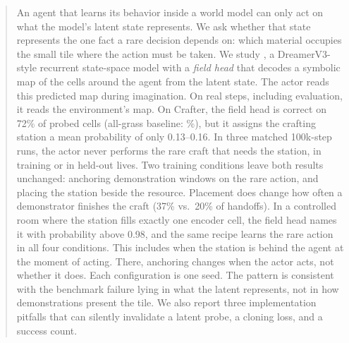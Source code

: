 \begin{abstract}
An agent that learns its behavior inside a world model can only act on what the model's latent state represents. We ask whether that state represents the one fact a rare decision depends on: which material occupies the small tile where the action must be taken.
We study \method{}, a DreamerV3-style recurrent state-space model with a \emph{field head} that decodes a symbolic map of the cells around the agent from the latent state. The actor reads this predicted map during imagination. On real steps, including evaluation, it reads the environment's map.
On Crafter, the field head is correct on 72\% of \FieldCells{} probed cells (all-grass baseline: \FieldBaseline\%), but it assigns the crafting station a mean probability of only 0.13--0.16. In three matched 100k-step runs, the actor never performs the rare craft that needs the station, in training or in held-out lives. Two training conditions leave both results unchanged: anchoring demonstration windows on the rare action, and placing the station beside the resource. Placement does change how often a demonstrator finishes the craft (37\% vs.\ 20\% of handoffs).
In a controlled room where the station fills exactly one encoder cell, the field head names it with probability above 0.98, and the same recipe learns the rare action in all four conditions. This includes when the station is behind the agent at the moment of acting. There, anchoring changes when the actor acts, not whether it does.
Each configuration is one seed. The pattern is consistent with the benchmark failure lying in what the latent represents, not in how demonstrations present the tile. We also report three implementation pitfalls that can silently invalidate a latent probe, a cloning loss, and a success count.
\end{abstract}

